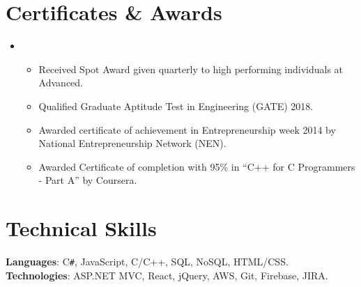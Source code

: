\documentclass[letterpaper,11pt]{article}
\newcommand{\resumeItem}[1]{
  \item\small{
    {#1 \vspace{-2pt}}
  }
}
\newcommand{\resumeItemListStart}{\begin{itemize}}
\newcommand{\resumeItemListEnd}{\end{itemize}\vspace{-5pt}}
\begin{document}

\section{Certificates \& Awards}
 \begin{itemize}[leftmargin=0.15in, label={}]
 \item {
    \resumeItemListStart
         \resumeItem{Received Spot Award given quarterly to high performing individuals at Advanced.}
         \resumeItem{Qualified Graduate Aptitude Test in Engineering (GATE) 2018.}
         \resumeItem {Awarded certificate of achievement in Entrepreneurship week 2014 by National Entrepreneurship Network (NEN).}
         \resumeItem { Awarded Certificate of completion with 95\% in “C++ for C Programmers - Part A” by Coursera.}
     \resumeItemListEnd
     }
 \end{itemize}


%

\section{Technical Skills}
 \begin{itemize}[leftmargin=0.15in, label={}]
    \small{\item{
     \textbf{Languages}{: C\texttt{\#}, JavaScript, C/C++, SQL, NoSQL, HTML/CSS.} \\
     \textbf{Technologies}{: ASP.NET MVC, React, jQuery, AWS, Git, Firebase, JIRA.} \\
    }}
 \end{itemize}

\end{document}
